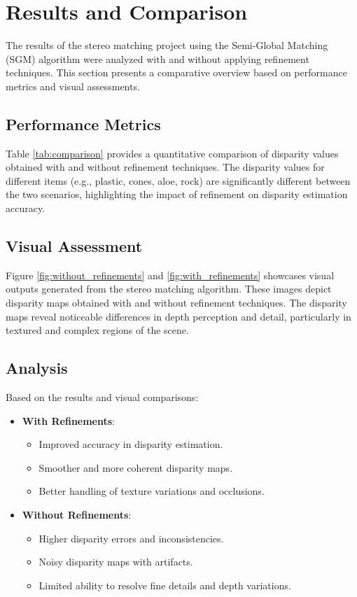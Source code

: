 \documentclass{article}
\begin{document}
\section{Results and Comparison}

The results of the stereo matching project using the Semi-Global Matching (SGM) algorithm were analyzed with and without applying refinement techniques. This section presents a comparative overview based on performance metrics and visual assessments.

\subsection{Performance Metrics}

Table \ref{tab:comparison} provides a quantitative comparison of disparity values obtained with and without refinement techniques. The disparity values for different items (e.g., plastic, cones, aloe, rock) are significantly different between the two scenarios, highlighting the impact of refinement on disparity estimation accuracy.

\subsection{Visual Assessment}

Figure \ref{fig:without_refinements} and \ref{fig:with_refinements}  showcases visual outputs generated from the stereo matching algorithm. These images depict disparity maps obtained with and without refinement techniques. The disparity maps reveal noticeable differences in depth perception and detail, particularly in textured and complex regions of the scene.

\subsection{Analysis}

Based on the results and visual comparisons:
\begin{itemize}
    \item \textbf{With Refinements}:
        \begin{itemize}
            \item Improved accuracy in disparity estimation.
            \item Smoother and more coherent disparity maps.
            \item Better handling of texture variations and occlusions.
        \end{itemize}
    \item \textbf{Without Refinements}:
        \begin{itemize}
            \item Higher disparity errors and inconsistencies.
            \item Noisy disparity maps with artifacts.
            \item Limited ability to resolve fine details and depth variations.
        \end{itemize}
\end{itemize}
\end{document}
